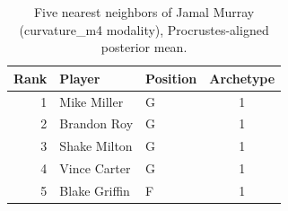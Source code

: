 \begin{table}[htbp]
  \centering\small
  \begin{tabular}{rllc}
    \toprule
    Rank & Player & Position & Archetype \\
    \midrule
    1 & Mike Miller & G & 1 \\
    2 & Brandon Roy & G & 1 \\
    3 & Shake Milton & G & 1 \\
    4 & Vince Carter & G & 1 \\
    5 & Blake Griffin & F & 1 \\
    \bottomrule
  \end{tabular}
  \caption{Five nearest neighbors of Jamal Murray (curvature_m4 modality), Procrustes-aligned posterior mean.}
  \label{tab:Jamal_Murray_neighbors_curvature_m4}
\end{table}

